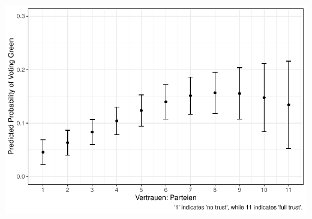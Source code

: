 \documentclass[
]{article}
\begin{document}
\includegraphics{AVCD_Final_Assignment-Edenhofer_files/figure-latex/gruene-trust-parties-1.pdf}
\end{document}
